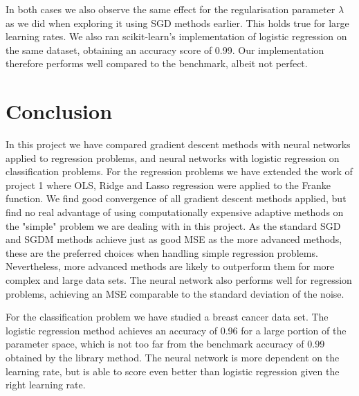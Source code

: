 \documentclass[a4paper, 
amsfonts, 
amssymb, 
amsmath, 
reprint, 
showkeys, 
nofootinbib, 
twoside]{revtex4-2}
\begin{document}
In both cases we also observe the same effect for the regularisation parameter $\lambda$ as we did when exploring it using SGD methods earlier. This holds true for large learning rates. 
We also ran scikit-learn's implementation of logistic regression on the same dataset, obtaining an accuracy score of 0.99. Our implementation therefore performs well compared to the benchmark, albeit not perfect.


\section{Conclusion}

In this project we have compared gradient descent methods with neural networks applied to regression problems, and neural networks with logistic regression on classification problems. 
For the regression problems we have extended the work of project 1 where OLS, Ridge and Lasso regression were applied to the Franke function. We find good convergence of all gradient descent methods applied, but find no real advantage of using computationally expensive adaptive methods on the "simple" problem we are dealing with in this project. As the standard SGD and SGDM methods achieve just as good MSE as the more advanced methods, these are the preferred choices when handling simple regression problems. Nevertheless, more advanced methods are likely to outperform them for more complex and large data sets. 
The neural network also performs well for regression problems, achieving an MSE comparable to the standard deviation of the noise.

For the classification problem we have studied a breast cancer data set. The logistic regression method achieves an accuracy of 0.96 for a large portion of the parameter space, which is not too far from the benchmark accuracy of 0.99 obtained by the library method. The neural network is more dependent on the learning rate, but is able to score even better than logistic regression given the right learning rate.

% 








\end{document}
